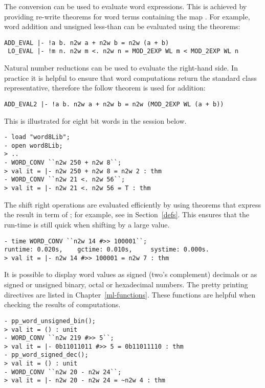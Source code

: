 The conversion  can be used to evaluate word expressions.  This is achieved by providing re-write theorems for word terms containing the map .  For example, word addition and unsigned less-than can be evaluated using the theorems:

\begin{hol}\begin{verbatim}
ADD_EVAL |- !a b. n2w a + n2w b = n2w (a + b)
 LO_EVAL |- !m n. n2w m <. n2w n = MOD_2EXP WL m < MOD_2EXP WL n
\end{verbatim}\end{hol}

\noindent Natural number reductions can be used to evaluate the right-hand side.  In practice it is helpful to ensure that word computations return the standard class representative, therefore the follow theorem is used for addition:

\begin{hol}\begin{verbatim}
ADD_EVAL2 |- !a b. n2w a + n2w b = n2w (MOD_2EXP WL (a + b))
\end{verbatim}\end{hol}

\noindent This is illustrated for eight bit words in the session below.

\setcounter{sessioncount}{0}
\begin{session}\begin{verbatim}
- load "word8Lib";
- open word8Lib;
> ..
- WORD_CONV ``n2w 250 + n2w 8``;
> val it = |- n2w 250 + n2w 8 = n2w 2 : thm
- WORD_CONV ``n2w 21 <. n2w 56``;
> val it = |- n2w 21 <. n2w 56 = T : thm
\end{verbatim}\end{session}

The shift right operations are evaluated efficiently by using theorems that express the result in term of ; for example, see  in Section~\ref{defs}.  This ensures that the run-time is still quick when shifting by a large value.

\begin{session}\begin{verbatim}
- time WORD_CONV ``n2w 14 #>> 100001``;
runtime: 0.020s,    gctime: 0.010s,     systime: 0.000s.
> val it = |- n2w 14 #>> 100001 = n2w 7 : thm
\end{verbatim}\end{session}

It is possible to display word values as signed (two's complement) decimals or as signed or unsigned binary, octal or hexadecimal numbers.  The pretty printing directives are listed in Chapter~\ref{ml-functions}.  These functions are helpful when checking the results of computations.
\begin{session}\begin{verbatim}
- pp_word_unsigned_bin();
> val it = () : unit
- WORD_CONV ``n2w 219 #>> 5``;
> val it = |- 0b11011011 #>> 5 = 0b11011110 : thm
- pp_word_signed_dec();
> val it = () : unit
- WORD_CONV ``n2w 20 - n2w 24``;
> val it = |- n2w 20 - n2w 24 = ~n2w 4 : thm
\end{verbatim}\end{session}

